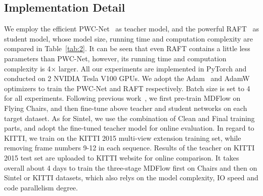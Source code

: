 \documentclass[lettersize,journal]{IEEEtran}
\begin{document}
\subsection{Implementation Detail} \label{Implementation Detail}
We employ the efficient PWC-Net~\cite{8579029} as teacher model, and the powerful RAFT~\cite{teed2020raft} as student model, whose model size, running time and computation complexity are compared in Table~\ref{tab:2}. It can be seen that even RAFT contains a little less parameters than PWC-Net, however, its running time and computation complexity is 4$\times$ larger. All our experiments are implemented in PyTorch and conducted on 2 NVIDIA Tesla V100 GPUs. We adopt the Adam~\cite{kingma2014method} and AdamW~\cite{loshchilov2018decoupled} optimizers to train the PWC-Net and RAFT respectively. Batch size is set to 4 for all experiments. Following previous work~\cite{Liu:2019:DDFlow,10.1007/978-3-030-58586-0_11,10.1007/978-3-030-58536-5_33}, we first pre-train MDFlow on Flying Chairs, and then fine-tune above teacher and student networks on each target dataset. As for Sintel, we use the combination of Clean and Final training parts, and adopt the fine-tuned teacher model for online evaluation. In regard to KITTI, we train on the KITTI 2015 multi-view extension training set, while removing frame numbers 9-12 in each sequence. Results of the teacher on KITTI 2015 test set are uploaded to KITTI website for online comparison. It takes overall about 4 days to train the three-stage MDFlow first on Chairs and then on Sintel or KITTI datasets, which also relys on the model complexity, IO speed and code parallelism degree.
\end{document}
